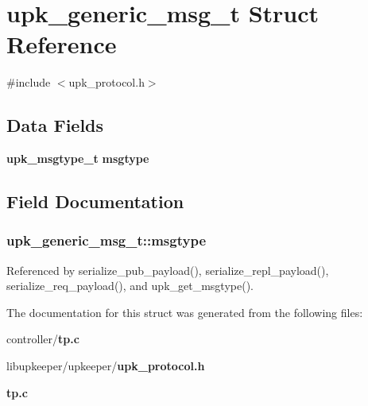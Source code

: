 \section{upk\_\-generic\_\-msg\_\-t Struct Reference}
\label{structupk__generic__msg__t}


{\ttfamily \#include $<$upk\_\-protocol.h$>$}

\subsection*{Data Fields}
\begin{DoxyCompactItemize}
\item 
{\bf upk\_\-msgtype\_\-t} {\bf msgtype}
\end{DoxyCompactItemize}


\subsection{Field Documentation}
\subsubsection[{msgtype}]{ {\bf upk\_\-generic\_\-msg\_\-t::msgtype}}\label{structupk__generic__msg__t_af8898deba9f752f9f6b0281800a4b9c1}


Referenced by serialize\_\-pub\_\-payload(), serialize\_\-repl\_\-payload(), serialize\_\-req\_\-payload(), and upk\_\-get\_\-msgtype().



The documentation for this struct was generated from the following files:\begin{DoxyCompactItemize}
\item 
controller/{\bf tp.c}\item 
libupkeeper/upkeeper/{\bf upk\_\-protocol.h}\item 
{\bf tp.c}\end{DoxyCompactItemize}
